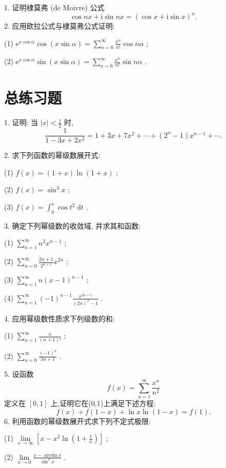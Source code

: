 1. 证明棣莫弗 (de Moivre) 公式
\[
\cos {nx} + \mathrm{i}\sin {nx} = {\left( \cos x + \mathrm{i}\sin x\right) }^{n}.
\]
2. 应用欧拉公式与棣莫弗公式证明:

(1) \({\mathrm{e}}^{x\cos \alpha }\cos \left( {x\sin \alpha }\right)  = \mathop{\sum }\limits_{{n = 0}}^{\infty }\frac{{x}^{n}}{n!}\cos {n\alpha }\) ;

(2) \({\mathrm{e}}^{x\cos \alpha }\sin \left( {x\sin \alpha }\right)  = \mathop{\sum }\limits_{{n = 0}}^{\infty }\frac{{x}^{n}}{n!}\sin {n\alpha }\) .

\section{总练习题}

1. 证明: 当 \(\left| x\right|  < \frac{1}{2}\) 时,
\[
\frac{1}{1 - {3x} + 2{x}^{2}} = 1 + {3x} + 7{x}^{2} + \cdots  + \left( {{2}^{n} - 1}\right) {x}^{n - 1} + \cdots .
\]

2. 求下列函数的幂级数展开式:

(1) \(f\left( x\right)  = \left( {1 + x}\right) \ln \left( {1 + x}\right)\) ;

(2) \(f\left( x\right)  = {\sin }^{3}x\) ;

(3) \(f\left( x\right)  = {\int }_{0}^{x}\cos {t}^{2}\mathrm{\;d}t\) .

3. 确定下列幂级数的收敛域, 并求其和函数:

(1) \(\mathop{\sum }\limits_{{n = 1}}^{\infty }{n}^{2}{x}^{n - 1}\) ;

(2) \(\mathop{\sum }\limits_{{n = 0}}^{\infty }\frac{{2n} + 1}{{2}^{n + 1}}{x}^{2n}\) ;

(3) \(\mathop{\sum }\limits_{{n = 1}}^{\infty }n{\left( x - 1\right) }^{n - 1}\) ;

(4) \(\mathop{\sum }\limits_{{n = 1}}^{\infty }{\left( -1\right) }^{n - 1}\frac{{x}^{{2n} + 1}}{{\left( 2n\right) }^{2} - 1}\) .

4. 应用幂级数性质求下列级数的和:

(1) \(\mathop{\sum }\limits_{{n = 1}}^{\infty }\frac{n}{\left( {n + 1}\right) !}\) ;

(2) \(\mathop{\sum }\limits_{{n = 0}}^{\infty }\frac{{\left( -1\right) }^{n}}{{3n} + 1}\) .

5. 设函数
\[
f\left( x\right)  = \mathop{\sum }\limits_{{n = 1}}^{\infty }\frac{{x}^{n}}{{n}^{2}}
\]
定义在 \(\left\lbrack  {0,1}\right\rbrack\) 上,证明它在(0,1)上满足下述方程:
\[
f\left( x\right)  + f\left( {1 - x}\right)  + \ln x\ln \left( {1 - x}\right)  = f\left( 1\right) .
\]
6. 利用函数的幂级数展开式求下列不定式极限:

(1) \(\mathop{\lim }\limits_{{x \rightarrow  \infty }}\left\lbrack  {x - {x}^{2}\ln \left( {1 + \frac{1}{x}}\right) }\right\rbrack\) ;

(2) \(\mathop{\lim }\limits_{{x \rightarrow  0}}\frac{x - \arcsin x}{{\sin }^{3}x}\) .


